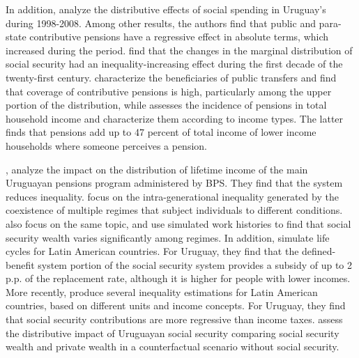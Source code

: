 \documentclass{article}
\begin{document}
In addition, \textcite{llambi2010estudio} analyze the distributive effects of social spending in Uruguay’s during 1998-2008. Among other results, the authors find that public and para-state contributive pensions have a regressive effect in absolute terms, which increased during the period. \textcite{alejo2014transferencias} find that the changes in the marginal distribution of social security had an inequality-increasing effect during the first decade of the twenty-first century. \textcite{dean2015acceso} characterize the beneficiaries of public transfers and find that coverage of contributive pensions is high, particularly among the upper portion of the distribution, while \textcite{naranja2014bps} assesses the incidence of pensions in total household income and characterize them according to income types. The latter finds that pensions add up to 47 percent of total income of lower income households where someone perceives a pension.

 \textcite{Forteza2012}, analyze the impact on the distribution of lifetime income of  the main Uruguayan pensions program administered by BPS. They find that the system reduces inequality. \textcite{carbajal2019desigualdades} focus on the intra-generational inequality generated by the coexistence of multiple regimes that subject individuals to different conditions. \textcite{caporale2021desigualdades} also focus on the same topic, and use simulated work histories to find that social security wealth varies significantly among regimes. In addition, \textcite{bosch2018presente} simulate life cycles for Latin American countries. For Uruguay, they find that the defined-benefit system portion of the social security system provides a subsidy of up to 2 p.p. of the replacement rate, although it is higher for people with lower incomes. More recently, \textcite{de2023more} produce several inequality estimations for Latin American countries, based on different units and income concepts. For Uruguay, they find that social security contributions are more regressive than income taxes.  \textcite{Lavalleja2022} assess the distributive impact of Uruguayan social security comparing social security wealth and private wealth in a counterfactual scenario without social security. 
\end{document}
